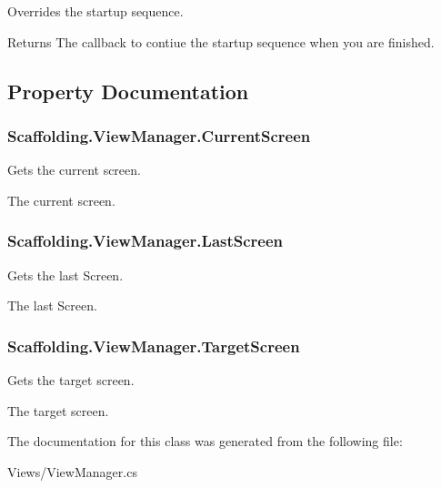 Overrides the startup sequence. 

\begin{DoxyReturn}{Returns}
The callback to contiue the startup sequence when you are finished.
\end{DoxyReturn}


\subsection{Property Documentation}
\hypertarget{class_scaffolding_1_1_view_manager_aeba5a2db8a3551991c2be765ee700dbd}{
\subsubsection[{Current\+Screen}]{ Scaffolding.\+View\+Manager.\+Current\+Screen\hspace{0.3cm}{\ttfamily [get]}}}\label{class_scaffolding_1_1_view_manager_aeba5a2db8a3551991c2be765ee700dbd}


Gets the current screen. 

The current screen.\hypertarget{class_scaffolding_1_1_view_manager_ac4d88a4e3c77abab903d16959b45cdae}{
\subsubsection[{Last\+Screen}]{ Scaffolding.\+View\+Manager.\+Last\+Screen\hspace{0.3cm}{\ttfamily [get]}}}\label{class_scaffolding_1_1_view_manager_ac4d88a4e3c77abab903d16959b45cdae}


Gets the last Screen. 

The last Screen.\hypertarget{class_scaffolding_1_1_view_manager_ad77b108adca50eb2af05eb2dbbe13701}{
\subsubsection[{Target\+Screen}]{ Scaffolding.\+View\+Manager.\+Target\+Screen\hspace{0.3cm}{\ttfamily [get]}}}\label{class_scaffolding_1_1_view_manager_ad77b108adca50eb2af05eb2dbbe13701}


Gets the target screen. 

The target screen.

The documentation for this class was generated from the following file\+:\begin{DoxyCompactItemize}
\item 
Views/View\+Manager.\+cs\end{DoxyCompactItemize}
